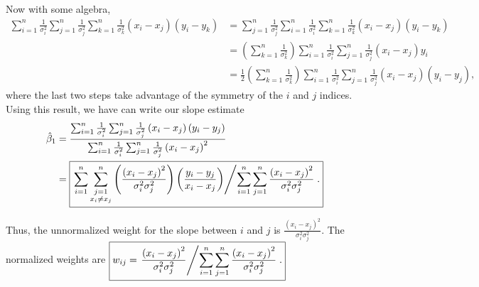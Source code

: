 \documentclass[11pt, letterpaper]{article}
\begin{document}
{\begin{enumerate}[(a)]
\begin{description}
Now with some algebra,
\begin{align*}
  \sum_{i=1}^n\frac{1}{\sigma_i^2}\sum_{j=1}^n\frac{1}{\sigma_j^2}\sum_{k=1}^n\frac{1}{\sigma_k^2}
  \left(x_i - x_j\right)\left(y_i - y_k\right)
  &= \sum_{j=1}^n\frac{1}{\sigma_j^2}\sum_{i=1}^n\frac{1}{\sigma_i^2}\sum_{k=1}^n\frac{1}{\sigma_k^2}
    \left(x_i - x_j\right)\left(y_i - y_k\right) \\
  &= \left(\sum_{k=1}^n\frac{1}{\sigma_k^2}\right)
    \sum_{i=1}^n\frac{1}{\sigma_i^2}\sum_{j=1}^n\frac{1}{\sigma_j^2}
    \left(x_i - x_j\right)y_i \\
  &= \frac{1}{2}\left(\sum_{k=1}^n\frac{1}{\sigma_k^2}\right)
    \sum_{i=1}^n\frac{1}{\sigma_i^2}\sum_{j=1}^n\frac{1}{\sigma_j^2}
    \left(x_i - x_j\right)\left(y_i - y_j\right),
\end{align*}
where the last two steps take advantage of the symmetry of the $i$ and $j$
indices. Using this result, we have can write our slope estimate
\begin{align*}
  \hat{\beta}_1
  &=
    \frac{\sum_{i=1}^n\frac{1}{\sigma_i^2}\sum_{j=1}^n\frac{1}{\sigma_j^2}
    \left(x_i - x_j\right)\left(y_i - y_j\right)}
  {\sum_{i=1}^n\frac{1}{\sigma_i^2}\sum_{j=1}^n\frac{1}{\sigma_j^2}
    \left(x_i - x_j\right)^2} \\
  &= \boxed{\left.
    \sum_{i=1}^n\sum_{\substack{j=1 \\ x_i \neq x_j}}^n \left(\frac{\left(x_i - x_j\right)^2}{\sigma_i^2\sigma_j^2}\right)
    \left(\frac{y_i - y_j}{x_i - x_j}\right)
    \middle/
    \sum_{i=1}^n\sum_{j=1}^n \frac{\left(x_i - x_j\right)^2}{\sigma_i^2\sigma_j^2}
    \right..}
\end{align*}

Thus, the unnormalized weight for the slope between $i$ and $j$ is
$\boxed{\displaystyle \frac{\left(x_i - x_j\right)^2}{\sigma_i^2\sigma_j^2}.}$
The normalized weights are
$\boxed{\displaystyle w_{ij} = \left.\frac{\left(x_i - x_j\right)^2}{\sigma_i^2\sigma_j^2}
    \middle/\sum_{i=1}^n\sum_{j=1}^n \frac{\left(x_i - x_j\right)^2}{\sigma_i^2\sigma_j^2}\right..}$


\end{description}
\end{enumerate}}
\end{document}
